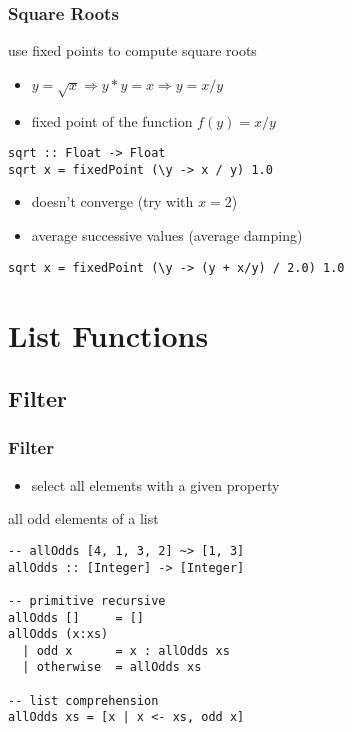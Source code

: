 \documentclass[dvipsnames]{beamer}
\theoremstyle{plain}
\begin{document}
\begin{frame}[fragile]
  \frametitle{Square Roots}

  \begin{exampleblock}{use fixed points to compute square roots}
    \begin{itemize}
      \item $y = \sqrt{x} \Rightarrow y * y = x \Rightarrow y = x / y$
      \item fixed point of the function $f(y) = x / y$
    \end{itemize}

    \smallskip
    \begin{lstlisting}[deletekeywords={sqrt}]
sqrt :: Float -> Float
sqrt x = fixedPoint (\y -> x / y) 1.0
    \end{lstlisting}
  \end{exampleblock}

  \pause
  \vspace{-6pt}
  \begin{itemize}
    \item doesn't converge (try with $x=2$)
    \item average successive values (average damping)
  \end{itemize}

  \begin{exampleblock}{}
    \begin{lstlisting}[deletekeywords={sqrt}]
sqrt x = fixedPoint (\y -> (y + x/y) / 2.0) 1.0
    \end{lstlisting}
  \end{exampleblock}
\end{frame}

\section{List Functions}

\subsection{Filter}

\begin{frame}[fragile]
  \frametitle{Filter}

  \begin{itemize}
    \item select all elements with a given property
  \end{itemize}

  \begin{exampleblock}{all odd elements of a list}
    \begin{lstlisting}
-- allOdds [4, 1, 3, 2] ~> [1, 3]
allOdds :: [Integer] -> [Integer]

-- primitive recursive
allOdds []     = []
allOdds (x:xs)
  | odd x      = x : allOdds xs
  | otherwise  = allOdds xs

-- list comprehension
allOdds xs = [x | x <- xs, odd x]
    \end{lstlisting}
  \end{exampleblock}
\end{frame}
\end{document}
